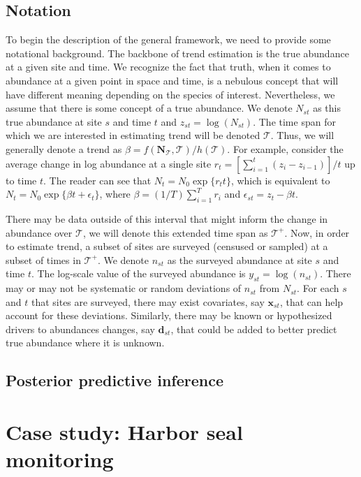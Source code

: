 \documentclass[12pt,letter]{article}
\newcommand{\Nst}{\ensuremath{N_{st}}}
\newcommand{\nst}{\ensuremath{n_{st}}}
\newcommand{\zst}{\ensuremath{z_{st}}}
\newcommand{\yst}{\ensuremath{y_{st}}}
\newcommand{\fT}{\ensuremath{\mathcal{T}}}
\newcommand{\fTp}{\ensuremath{\mathcal{T}^+}}
\newcommand{\bNT}{\ensuremath{\mathbf{N}_\mathcal{T}}}
\newcommand{\bx}{\ensuremath{\mathbf{x}}}
\begin{document}
\subsection{Notation}

To begin the description of the general framework, we need to provide some notational background. The backbone of trend estimation is the true abundance at a given site and time. We recognize the fact that truth, when it comes to abundance at a given point in space and time, is a nebulous concept that will have different meaning depending on the species of interest. Nevertheless, we assume that there is some concept of a true abundance. We denote $\Nst$ as this true abundance at site $s$ and time $t$ and $\zst=\log(\Nst)$. The time span for which we are interested in estimating trend will be denoted $\fT$. Thus, we will generally denote a trend as $\beta = f(\bNT, \fT)/h(\fT)$. For example, consider the average change in log abundance at a single site $r_t = [\sum_{i=1}^t(z_{i}-z_{i-1})]/t$ up to time $t$. The reader can see that $N_t = N_{0}\exp\{r_{t}t\}$, which is equivalent to $N_t = N_{0}\exp\{\beta t + \epsilon_{t}\}$, where $\beta=(1/T)\sum_{i=1}^T r_i$ and $\epsilon_{st}=z_t-\beta t$.

There may be data outside of this interval that might inform the change in abundance over $\fT$, we will denote this extended time span as $\fTp$. Now, in order to estimate trend, a subset of sites are surveyed (censused or sampled) at a subset of times in $\fTp$. We denote $\nst$ as the surveyed abundance at site $s$ and time $t$. The log-scale value of the surveyed abundance is $\yst=\log(\nst)$. There may or may not be systematic or random deviations of $\nst$ from $\Nst$. For each $s$ and $t$ that sites are surveyed, there may exist covariates, say $\bx_{st}$, that can help account for these deviations. Similarly, there may be known or hypothesized drivers to abundances changes, say $\mathbf{d}_{st}$, that could be added to better predict true abundance where it is unknown.


\subsection{Posterior predictive inference}



\section{Case study: Harbor seal monitoring}
\end{document}
